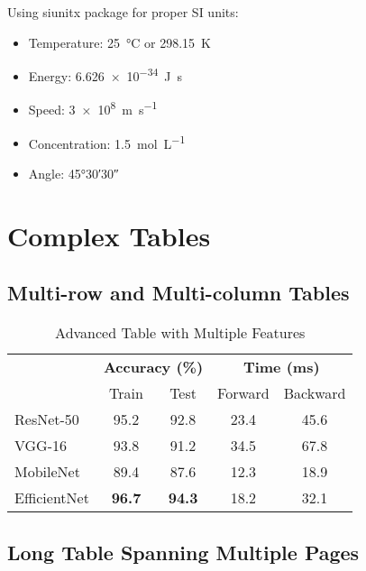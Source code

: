 \documentclass[11pt,a4paper]{article}
\theoremstyle{definition}
\begin{document}
Using siunitx package for proper SI units:

\begin{itemize}
    \item Temperature: \SI{25}{\celsius} or \SI{298.15}{\kelvin}
    \item Energy: \SI{6.626e-34}{\joule\second}
    \item Speed: \SI{3e8}{\meter\per\second}
    \item Concentration: \SI{1.5}{\mol\per\liter}
    \item Angle: \ang{45;30;30}
\end{itemize}

\section{Complex Tables}

\subsection{Multi-row and Multi-column Tables}

\begin{table}[H]
\centering
\caption{Advanced Table with Multiple Features}
\label{tab:advanced}
\begin{tabular}{|l|c|c|c|c|}
\hline
\rowcolor{gray!30}
\multirow{2}{*}{\textbf{Model}} & \multicolumn{2}{c|}{\textbf{Accuracy (\%)}} & \multicolumn{2}{c|}{\textbf{Time (ms)}} \\
\cline{2-5}
\rowcolor{gray!30}
 & Train & Test & Forward & Backward \\
\hline
ResNet-50 & 95.2 & 92.8 & 23.4 & 45.6 \\
\rowcolor{blue!10}
VGG-16 & 93.8 & 91.2 & 34.5 & 67.8 \\
MobileNet & 89.4 & 87.6 & 12.3 & 18.9 \\
\rowcolor{green!10}
EfficientNet & \textbf{96.7} & \textbf{94.3} & 18.2 & 32.1 \\
\hline
\end{tabular}
\end{table}

\subsection{Long Table Spanning Multiple Pages}
\end{document}
